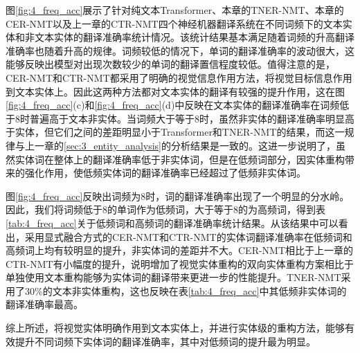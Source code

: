 图\ref{fig:4_freq_acc}展示了针对纯文本Transformer、本章的TNER-NMT、本章的CER-NMT以及上一章的CTR-NMT四个神经机器翻译系统在不同词频下的文本实体和非文本实体的翻译准确率统计情况。该统计结果基本满足随着词频的升高翻译准确率也随着升高的规律。词频较低的情况下，单词的翻译准确率的波动很大，这能够反映出模型对出现次数较少的单词的翻译置信程度较低。值得注意的是，CER-NMT和CTR-NMT都采用了明确的视觉信息作用方法，将视觉目标信息作用到文本实体上。因此这两种方法都对文本实体的翻译有较强的提升作用，这在图\ref{fig:4_freq_acc}(c)和\ref{fig:4_freq_acc}(d)中反映在文本实体的翻译准确率在词频低于8时普遍高于文本非实体。当词频大于等于8时，虽然非实体的翻译准确率明显高于实体，但它们之间的差距明显小于Transformer和TNER-NMT的结果，而这一规律与上一章的\ref{sec:3_entity_analysis}的分析结果是一致的。这进一步说明了，虽然实体词在整体上的翻译准确率低于非实体词，但是在低频词部分，因实体重构带来的强化作用，使低频实体词的翻译准确率已经超过了低频非实体词。


图\ref{fig:4_freq_acc}反映出词频为8时，词的翻译准确率出现了一个明显的分水岭。因此，我们将词频低于8的单词作为低频词，大于等于8的为高频词，得到表\ref{tab:4_freq_acc}关于低频词和高频词的翻译准确率统计结果。从该结果中可以看出，采用显式融合方式的CER-NMT和CTR-NMT的实体词翻译准确率在低频词和高频词上均有较明显的提升，非实体词的差距并不大。CER-NMT相比于上一章的CTR-NMT有小幅度的提升，说明增加了视觉实体重构的双向实体重构方案相比于单独使用文本重构能够为实体词的翻译带来更进一步的性能提升。TNER-NMT采用了30\%的文本非实体重构，这也反映在表\ref{tab:4_freq_acc}中其低频非实体词的翻译准确率最高。

综上所述，将视觉实体明确作用到文本实体上，并进行实体级的重构方法，能够有效提升不同词频下实体词的翻译准确率，其中对低频词的提升最为明显。